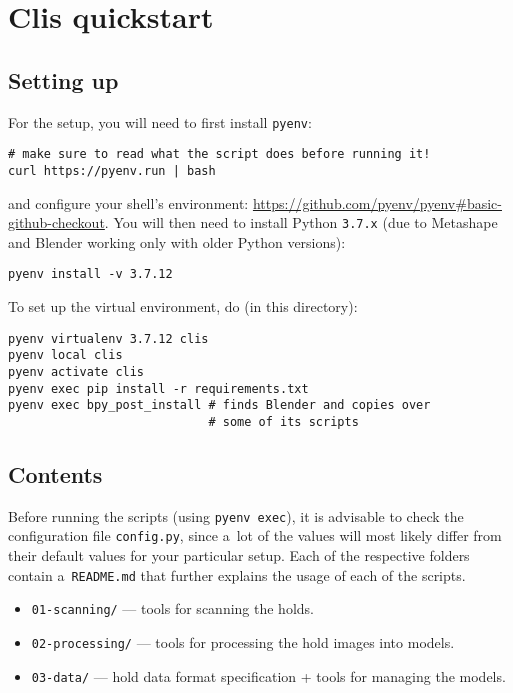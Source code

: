 \chapter{Clis quickstart}\label{apx:clis}

\section{Setting up}\label{apx:clissetup}

For the setup, you will need to first install \texttt{pyenv}:
\begin{verbatim}
# make sure to read what the script does before running it!
curl https://pyenv.run | bash
\end{verbatim}
and configure your shell's environment: \url{https://github.com/pyenv/pyenv\#basic-github-checkout}.
You will then need to install Python \texttt{3.7.x} (due to Metashape and Blender working only with older Python versions):

\begin{verbatim}
pyenv install -v 3.7.12
\end{verbatim}

To set up the virtual environment, do (in this directory):

\begin{verbatim}
pyenv virtualenv 3.7.12 clis
pyenv local clis
pyenv activate clis
pyenv exec pip install -r requirements.txt
pyenv exec bpy_post_install # finds Blender and copies over
                            # some of its scripts
\end{verbatim}

\section{Contents}

Before running the scripts (using \texttt{pyenv exec}), it is advisable
to check the configuration file \texttt{config.py}, since a~lot of the values will most likely
differ from their default values for your particular setup. Each of the
respective folders contain a~\texttt{README.md} that further explains
the usage of each of the scripts.

\begin{itemize}
	\item \texttt{01-scanning/} --- tools for scanning the holds.
	\item \texttt{02-processing/} --- tools for processing the hold images into models.
	\item \texttt{03-data/} --- hold data format specification + tools for managing the models.
\end{itemize}

